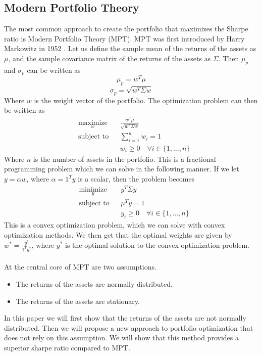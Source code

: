\documentclass[10pt]{article}
\begin{document}
\subsection{Modern Portfolio Theory}
The most common approach to create the portfolio that maximizes the Sharpe ratio is Modern Portfolio Theory (MPT). MPT was first
introduced by Harry Markowitz in 1952 \cite{markowitz1952portfolio}. Let us define
the sample mean of the returns of the assets as $\mu$, and the sample covariance matrix of the returns of the assets as $\Sigma$. Then $\mu_p$
and $\sigma_p$ can be written as
\begin{equation}
    \mu_p = w^T\mu
\end{equation}
\begin{equation}
    \sigma_p = \sqrt{w^T\Sigma w}
\end{equation}
Where $w$ is the weight vector of the portfolio. The optimization problem can then be written as
\begin{equation}
    \begin{aligned}
        & \underset{w}{\text{maximize}}
        & & \frac{w^T\mu}{\sqrt{w^T\Sigma w}} \\
        & \text{subject to}
        & & \sum_{i=1}^n w_i = 1 \\
        & & & w_i \geq 0 \quad \forall i \in \{1, \dots, n\}
    \end{aligned}
\end{equation}
Where $n$ is the number of assets in the portfolio. This is a fractional programming problem which we can solve in the following manner.\cite{its_convex_if_you_tilt_your_head_a_bit} 
If we let $y=\alpha w$, where $\alpha=1^T y$ is a scalar, then the problem becomes
\begin{equation}
    \begin{aligned}
        & \underset{y}{\text{minimize}}
        & & y^T\Sigma y\\
        & \text{subject to}
        & & \mu^Ty = 1 \\
        & & & y_i \geq 0 \quad \forall i \in \{1, \dots, n\}
    \end{aligned}
\end{equation}
This is a convex optimization problem, which we can solve with convex optimization methods. We then get 
that the optimal weights are given by $w^* = \frac{y^*}{1^T y^*}$, where $y^*$ is the optimal solution to the convex optimization problem.\\\\
At the central core of MPT are two assumptions.
\begin{itemize}
    \item The returns of the assets are normally distributed.
    \item The returns of the assets are stationary.
\end{itemize}
In this paper we will first show that the returns of the assets are not normally distributed. Then we will propose a new 
approach to portfolio optimization that does not rely on this assumption. We will show that this method provides a superior 
sharpe ratio compared to MPT.
\end{document}
